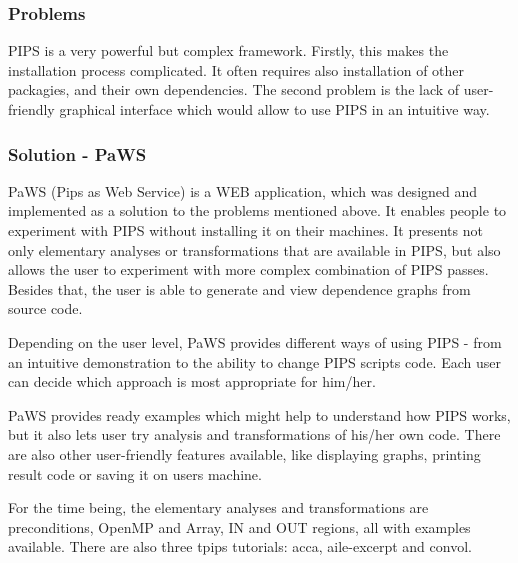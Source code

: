 
\subsubsection{Problems}

PIPS is a very powerful but complex framework. Firstly, this makes the
installation process complicated. It often requires also installation
of other packagies, and their own dependencies. The second problem is
the lack of user-friendly graphical interface which would allow to use
PIPS in an intuitive way.

\subsubsection{Solution - PaWS}

PaWS (Pips as Web Service) is a WEB application, which was designed
and implemented as a solution to the problems mentioned above. It
enables people to experiment with PIPS without installing it on their
machines. It presents not only elementary analyses or transformations
that are available in PIPS, but also allows the user to experiment
with more complex combination of PIPS passes. Besides that, the user is
able to generate and view dependence graphs from source code.

Depending on the user level, PaWS provides different ways of using
PIPS - from an intuitive demonstration to the ability to change PIPS
scripts code. Each user can decide which approach is most appropriate for
him/her.

PaWS provides ready examples which might help to understand how
PIPS works, but it also lets user try analysis and transformations of
his/her own code. There are also other user-friendly features
available, like displaying graphs, printing result code or saving it
on users machine.

For the time being, the elementary analyses and transformations are
preconditions, OpenMP and Array, IN and OUT regions, all with examples
available. There are also three tpips tutorials: acca, aile-excerpt
and convol.
